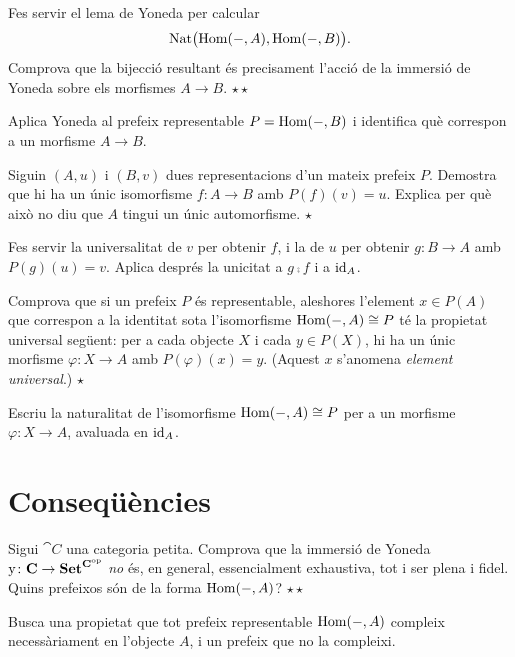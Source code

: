 \begin{exercici}
Fes servir el lema de Yoneda per calcular
\[
\operatorname{Nat}\bigl(\operatorname{Hom}(-,A),\operatorname{Hom}(-,B)\bigr).
\]
Comprova que la bijecció resultant és precisament l'acció de la immersió de Yoneda sobre els morfismes $A\to B$. \hfill{\normalfont$\star\star$}
\begin{indicacio}
Aplica Yoneda al prefeix representable $P=\operatorname{Hom}(-,B)$ i identifica què correspon a un morfisme $A\to B$.
\end{indicacio}
\end{exercici}

\begin{exercici}
Siguin $(A,u)$ i $(B,v)$ dues representacions d'un mateix prefeix $P$. Demostra que hi ha un únic isomorfisme $f\colon A\to B$ amb $P(f)(v)=u$. Explica per què això no diu que $A$ tingui un únic automorfisme. \hfill{\normalfont$\star$}
\begin{indicacio}
Fes servir la universalitat de $v$ per obtenir $f$, i la de $u$ per obtenir $g\colon B\to A$ amb $P(g)(u)=v$. Aplica després la unicitat a $g\comp f$ i a $\operatorname{id}_A$.
\end{indicacio}
\end{exercici}

\begin{exercici}
Comprova que si un prefeix $P$ és representable, aleshores l'element $x\in P(A)$ que correspon a la identitat sota l'isomorfisme $\operatorname{Hom}(-,A)\cong P$ té la propietat universal següent: per a cada objecte $X$ i cada $y\in P(X)$, hi ha un únic morfisme $\varphi\colon X\to A$ amb $P(\varphi)(x)=y$. (Aquest $x$ s'anomena \emph{element universal}.) \hfill{\normalfont$\star$}
\begin{indicacio}
Escriu la naturalitat de l'isomorfisme $\operatorname{Hom}(-,A)\cong P$ per a un morfisme $\varphi\colon X\to A$, avaluada en $\operatorname{id}_A$.
\end{indicacio}
\end{exercici}

\section{Conseqüències}

\begin{exercici}
Sigui $\cat{C}$ una categoria petita. Comprova que la immersió de Yoneda $\mathrm{y}\colon\mathbf{C}\to\mathbf{Set}^{\mathbf{C}^{\mathrm{op}}}$ \emph{no} és, en general, essencialment exhaustiva, tot i ser plena i fidel. Quins prefeixos són de la forma $\operatorname{Hom}(-,A)$? \hfill{\normalfont$\star\star$}
\begin{indicacio}
Busca una propietat que tot prefeix representable $\operatorname{Hom}(-,A)$ compleix necessàriament en l'objecte $A$, i un prefeix que no la compleixi.
\end{indicacio}
\end{exercici}

